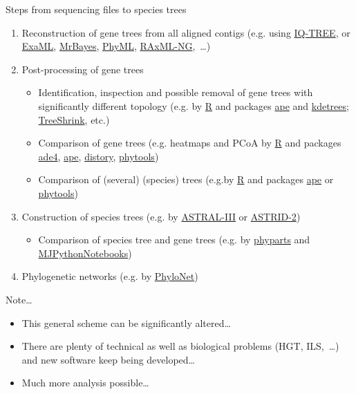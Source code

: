 \documentclass[compress, ucs, xelatex, 11pt, xcolor=x11names, aspectratio=169,
	hyperref={
		bookmarks=true,
		unicode=true,
		colorlinks=true,
		pdftitle={HybSeq course},
		plainpages=false,
		pdfauthor={Vojtech Zeisek},
		pdfsubject={Practical processing of HybSeq target enrichment sequencing data on computing grids like MetaCentrum},
		pdfcreator={XeLaTeX},
		pdfkeywords={BASH, command line, GNU, HybSeq, Linux, MetaCentrum, sequencing shell, target enrichment},
		linkcolor=Turquoise4, %
		anchorcolor=DodgerBlue4, %
		citecolor=DodgerBlue4, %
		filecolor=DodgerBlue4, %
		menucolor=Tan4, %
		urlcolor=DarkOliveGreen4, %
		pdftex},
	url={hyphens, lowtilde} %
	]{beamer}
\begin{document}
\begin{frame}[allowframebreaks]{Steps from sequencing files to species trees}
\begin{enumerate}
		\item Reconstruction of gene trees from all aligned contigs (e.g. using \href{http://www.iqtree.org/}{IQ-TREE}, or \href{https://github.com/stamatak/ExaML}{ExaML}, \href{https://nbisweden.github.io/MrBayes/}{MrBayes}, \href{http://www.atgc-montpellier.fr/phyml/}{PhyML}, \href{https://github.com/amkozlov/raxml-ng}{RAxML-NG},~\ldots)
		\item Post-processing of gene trees
		\begin{itemize}
			\item Identification, inspection and possible removal of gene trees with significantly different topology (e.g. by \href{https://www.r-project.org/}{R} and packages \href{https://cran.r-project.org/package=ape}{ape} and \href{https://cran.r-project.org/package=kdetrees}{kdetrees}; \href{https://github.com/uym2/TreeShrink}{TreeShrink}, etc.)
			\item Comparison of gene trees (e.g. heatmaps and PCoA by \href{https://www.r-project.org/}{R} and packages \href{https://cran.r-project.org/package=ade4}{ade4}, \href{https://cran.r-project.org/package=ape}{ape}, \href{https://cran.r-project.org/package=distory}{distory}, \href{https://cran.r-project.org/package=phytools}{phytools})
			\item Comparison of (several) (species) trees (e.g.by \href{https://www.r-project.org/}{R} and packages \href{https://cran.r-project.org/package=ape}{ape} or \href{https://cran.r-project.org/package=phytools}{phytools})
		\end{itemize}
		\item Construction of species trees (e.g. by \href{https://github.com/smirarab/ASTRAL}{ASTRAL-III} or \href{https://github.com/pranjalv123/ASTRID}{ASTRID-2})
		\begin{itemize}
			\item Comparison of species tree and gene trees (e.g. by \href{https://bitbucket.org/blackrim/phyparts}{phyparts} and \href{https://github.com/mossmatters/MJPythonNotebooks}{MJPythonNotebooks})
		\end{itemize}
		\item Phylogenetic networks (e.g. by \href{https://bioinfocs.rice.edu/PhyloNet}{PhyloNet})
	\end{enumerate}
	\vfill
	\begin{block}{Note\ldots}
		\begin{itemize}
			\item This general scheme can be significantly altered\ldots
			\item There are plenty of technical as well as biological problems (HGT, ILS,~\ldots) and new software keep being developed\ldots
			\item Much more analysis possible\ldots
		\end{itemize}
	\end{block}
	\vfill
\end{frame}
\end{document}
